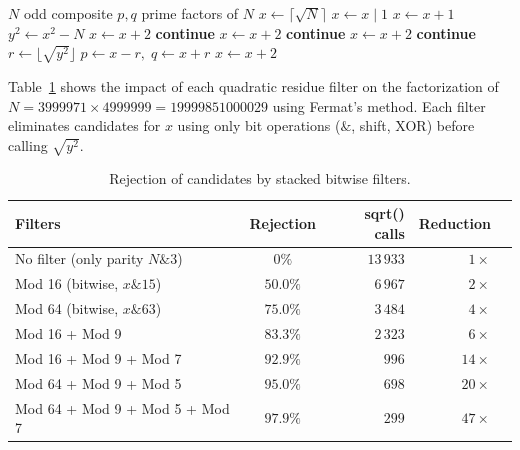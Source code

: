\documentclass[12pt,a4paper]{article}
\theoremstyle{plain}
\begin{document}
\begin{algorithm}[H]
\caption{Fermat's factorization with stacked bitwise filters}
\label{alg:fermat_bitwise}
\begin{algorithmic}[1]
\Require $N$ odd composite
\Ensure $p,q$ prime factors of $N$
\State $x \gets \lceil\sqrt{N}\rceil$
    \State $x \gets x \mid 1$ 
  \EndIf
\Else
    \State $x \gets x + 1$ 
  \EndIf
\EndIf
\Loop
  \State $y^2 \gets x^2 - N$
    \State $x \gets x + 2$ 
    \State \textbf{continue}
  \EndIf
    \State $x \gets x + 2$ 
    \State \textbf{continue}
  \EndIf
    \State $x \gets x + 2$ 
    \State \textbf{continue}
  \EndIf
  \State $r \gets \lfloor\sqrt{y^2}\rfloor$ 
    \State \Return $p \gets x - r,\; q \gets x + r$
  \EndIf
  \State $x \gets x + 2$
\EndLoop
\end{algorithmic}
\end{algorithm}

Table~\ref{tab:filtros} shows the impact of each quadratic residue
filter on the factorization of $N = 3999971 \times 4999999 = 19999851000029$
using Fermat's method. Each filter eliminates candidates for $x$ using
only bit operations ($\&$, shift, XOR) before calling
$\sqrt{y^2}$.

\begin{table}[htbp]
\centering
\caption{Rejection of candidates by stacked bitwise filters.}
\label{tab:filtros}
\begin{tabular}{lcrrr}
\hline
Filters & Rejection & sqrt() calls & Reduction \\
\hline
No filter (only parity $N\&3$) & $0\%$ & $13\,933$ & $1\times$ \\
Mod 16 (bitwise, $x\&15$) & $50.0\%$ & $6\,967$ & $2\times$ \\
Mod 64 (bitwise, $x\&63$) & $75.0\%$ & $3\,484$ & $4\times$ \\
Mod 16 + Mod 9 & $83.3\%$ & $2\,323$ & $6\times$ \\
Mod 16 + Mod 9 + Mod 7 & $92.9\%$ & $996$ & $14\times$ \\
Mod 64 + Mod 9 + Mod 5 & $95.0\%$ & $698$ & $20\times$ \\
Mod 64 + Mod 9 + Mod 5 + Mod 7 & $97.9\%$ & $299$ & $47\times$ \\
\hline
\end{tabular}
\end{table}
\end{document}
